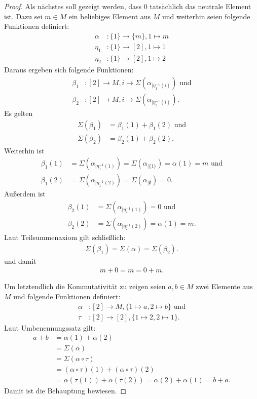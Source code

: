 \documentclass{article}
\begin{document}
\begin{proof}
  Als nächstes soll gezeigt werden, dass $0$ tatsächlich das neutrale Element ist.
  Dazu sei $m \in M$ ein beliebiges Element aus $M$ und weiterhin seien folgende Funktionen definiert:
  \begin{align*}
    \alpha &\colon \{ 1 \} \to \{ m \}, 1 \mapsto m\\
    \eta_1 &\colon \{ 1 \} \to [2], 1 \mapsto 1\\
    \eta_2 &\colon \{ 1 \} \to [2], 1 \mapsto 2
  \end{align*}
  Daraus ergeben sich folgende Funktionen:
  \begin{align*}
    \beta_1 &\colon [2] \to M, i \mapsto \Sigma(\alpha_{\mid \eta_1^{-1}(i)}) \text{ und} \\
    \beta_2 &\colon [2] \to M, i \mapsto \Sigma(\alpha_{\mid \eta_2^{-1}(i)}).
  \end{align*}
  Es gelten
  \begin{align*}
    \Sigma(\beta_1) &= \beta_1(1) + \beta_1(2) \text{ und}\\
    \Sigma(\beta_2) &= \beta_2(1) + \beta_2(2).
  \end{align*}
  Weiterhin ist
  \begin{align*}
    \beta_1(1) &= \Sigma(\alpha_{\mid \eta_1^{-1}(1)}) = \Sigma(\alpha_{\mid \{1\}}) = \alpha(1) = m \text{ und}\\
    \beta_1(2) &= \Sigma(\alpha_{\mid \eta_1^{-1}(2)}) = \Sigma(\alpha_{\mid \emptyset}) = 0.
  \end{align*}
  Außerdem ist
  \begin{align*}
    \beta_2(1) &= \Sigma(\alpha_{\mid \eta_2^{-1}(1)}) = 0 \text{ und}\\
    \beta_2(2) &= \Sigma(\alpha_{\mid \eta_2^{-1}(2)}) = \alpha(1) = m.
  \end{align*}
  Laut Teilsummenaxiom gilt schließlich:
  \begin{align*}
    \Sigma(\beta_1) = \Sigma(\alpha) = \Sigma(\beta_2).
  \end{align*}
  und damit
  \begin{align*}
    m + 0 = m = 0 + m.
  \end{align*}
  
  Um letztendlich die Kommutativität zu zeigen seien $a,b \in M$ zwei Elemente aus $M$ und 
  folgende Funktionen definiert:
  \begin{align*}
    \alpha &\colon [2] \to M, \{ 1 \mapsto a, 2 \mapsto b\} \text{ und}\\
    \tau &\colon [2] \to [2], \{ 1 \mapsto 2, 2 \mapsto 1 \}.
  \end{align*}
  Laut Umbenennungssatz gilt:
  \begin{align*}
    a + b &= \alpha(1) + \alpha(2)\\
    &= \Sigma(\alpha)\\
    &= \Sigma(\alpha \circ \tau)\\
    &= (\alpha \circ \tau)(1) + (\alpha \circ \tau)(2)\\
    &= \alpha(\tau(1)) + \alpha(\tau(2)) = \alpha(2) + \alpha(1) = b + a.
  \end{align*}
  Damit ist die Behauptung bewiesen.
\end{proof}
\end{document}
